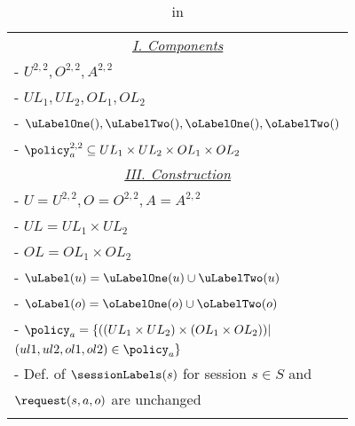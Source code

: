
\begin{table}
	\centering
	\caption{  \labacZeroTwoTwo{} in \labacZeroOneOne{}} %
	\label{tab:lbac-in-labac}
	\begin{tabular}{|l|}						
		\hline					
		\multicolumn{1}{|c|}{\underline{\textit{I. \labacZeroTwoTwo{} Components }}}\\	
		 - $U^{2,2}, O^{2,2}, A^{2,2}$	\\		 
	     - $UL_1, UL_2, OL_1, OL_2$\\
		 -  $\uLabelOne(), \uLabelTwo(), \oLabelOne(), \oLabelTwo()$ \\
		 -  $\policy^{2,2}_a \subseteq  UL_1 \times UL_2 \times OL_1 \times OL_2$\\	 
		\multicolumn{1}{|c|}{\underline{\textit{III. Construction}}} \\
		 - $U = U^{2,2}, O = O^{2,2}, A = A^{2,2}$\\
		 -  $UL = UL_1 \times UL_2$ \\
		 - $OL = OL_1 \times OL_2$\\		 
		 -  $  \uLabel(u) =  \uLabelOne(u) \cup \uLabelTwo(u)$ \\
		 -  $  \oLabel(o) =  \oLabelOne(o) \cup \oLabelTwo(o)$ \\ 
		 - $ \policy_{a} = \{ ( (UL_1 \times UL_2) \times (OL_1 \times OL_2))|$ \\ \hfill $(ul1, ul2, ol1, ol2) \in \policy_a \}$ \\
		 - Def. of  $\sessionLabels(s)$ for session $s \in S$  and \\ \hfill $\request(s, a, o)$   are unchanged 	\\	
	 
		\\ \hline	
	\end{tabular}	
\end{table}
